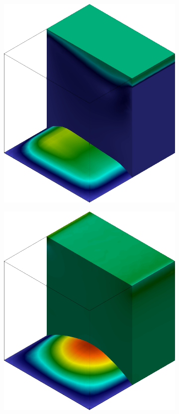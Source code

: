 \begin{figure}[h!]
\begin{subfigure}[b]{0.23\textwidth}
        \includegraphics[width=\linewidth]{Figuras/FSI-Cavity3D/u4.png}
    \end{subfigure}
    \caption*{$t=4,0$}
    \begin{subfigure}[b]{0.23\textwidth}
        \includegraphics[width=\linewidth]{Figuras/FSI-Cavity3D/p6.png}

\end{subfigure}
\end{figure}
